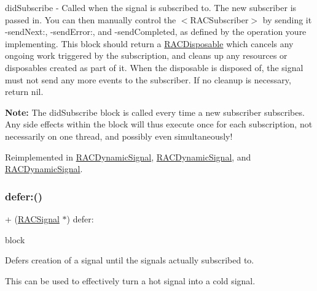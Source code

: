 did\+Subscribe -\/ Called when the signal is subscribed to. The new subscriber is passed in. You can then manually control the $<$\+R\+A\+C\+Subscriber$>$ by sending it -\/send\+Next\+:, -\/send\+Error\+:, and -\/send\+Completed, as defined by the operation you\textquotesingle{}re implementing. This block should return a \mbox{\hyperlink{interface_r_a_c_disposable}{R\+A\+C\+Disposable}} which cancels any ongoing work triggered by the subscription, and cleans up any resources or disposables created as part of it. When the disposable is disposed of, the signal must not send any more events to the {\ttfamily subscriber}. If no cleanup is necessary, return nil.

{\bfseries Note\+:} The {\ttfamily did\+Subscribe} block is called every time a new subscriber subscribes. Any side effects within the block will thus execute once for each subscription, not necessarily on one thread, and possibly even simultaneously! 

Reimplemented in \mbox{\hyperlink{interface_r_a_c_dynamic_signal_aeffa754150754dd6296d5225b5c9c7fe}{R\+A\+C\+Dynamic\+Signal}}, \mbox{\hyperlink{interface_r_a_c_dynamic_signal_aeffa754150754dd6296d5225b5c9c7fe}{R\+A\+C\+Dynamic\+Signal}}, and \mbox{\hyperlink{interface_r_a_c_dynamic_signal_aeffa754150754dd6296d5225b5c9c7fe}{R\+A\+C\+Dynamic\+Signal}}.

\mbox{\label{interface_r_a_c_signal_a3f29638c9c7f60928b7a6cbf2fe25d6f}} 
\subsubsection{\texorpdfstring{defer\+:()}{defer:()}\hspace{0.1cm}{\footnotesize\ttfamily [1/3]}}
{\footnotesize\ttfamily + (\mbox{\hyperlink{interface_r_a_c_signal}{R\+A\+C\+Signal}} $\ast$) defer\+: \begin{DoxyParamCaption}\item[{(\mbox{\hyperlink{interface_r_a_c_signal}{R\+A\+C\+Signal}} $\ast$($^\wedge$)(void))}]{block }\end{DoxyParamCaption}}

Defers creation of a signal until the signal\textquotesingle{}s actually subscribed to.

This can be used to effectively turn a hot signal into a cold signal. 

